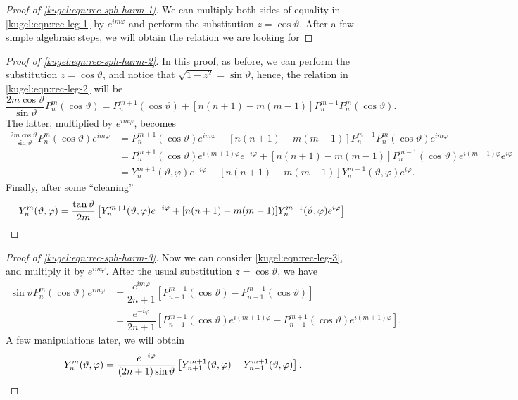 \begin{proof}[Proof of \eqref{kugel:eqn:rec-sph-harm-1}]
  We can multiply both sides of equality in \eqref{kugel:eqn:rec-leg-1} by $e^{im
  \varphi}$ and perform the substitution $z=\cos \vartheta$. After a few simple
  algebraic steps, we will obtain the relation we are looking for
\end{proof}

\begin{proof}[Proof of \eqref{kugel:eqn:rec-sph-harm-2}]
  In this proof, as before, we can perform the substitution $z=\cos \vartheta$,
  and notice that $\sqrt{1-z^2}=\sin \vartheta$, hence, the relation in
  \eqref{kugel:eqn:rec-leg-2} will be
  \begin{equation*}
    \frac{2m \cos \vartheta}{\sin \vartheta} P^m_n(\cos \vartheta) 
    = P^{m+1}_n(\cos \vartheta) + [n(n+1)-m(m-1)]P^{m-1}_n P^m_n(\cos \vartheta).
  \end{equation*}
  The latter, multiplied by $e^{im\varphi}$, becomes
  \begin{align*}
    \frac{2m \cos \vartheta}{\sin \vartheta} P^m_n(\cos \vartheta)e^{im\varphi}
      &= P^{m+1}_n(\cos \vartheta)e^{im\varphi}
       + [n(n+1)-m(m-1)]P^{m-1}_n P^m_n(\cos \vartheta)e^{im\varphi} \\
      &= P^{m+1}_n(\cos \vartheta)e^{i(m+1)\varphi}e^{-i\varphi}
       + [n(n+1)-m(m-1)]P^{m-1}_n (\cos \vartheta)e^{i(m-1)\varphi}e^{i\varphi} \\
      &= Y^{m+1}_n(\vartheta, \varphi)e^{-i\varphi}
       + [n(n+1)-m(m-1)]Y^{m-1}_n(\vartheta, \varphi)e^{i\varphi}.
  \end{align*}
  Finally, after some ``cleaning''
  \begin{equation*}
    Y^m_n(\vartheta, \varphi) = \frac{\tan \vartheta}{2m} \left[
      Y^{m+1}_n(\vartheta, \varphi)e^{-i\varphi}
      + [n(n+1)-m(m-1)]Y^{m-1}_n(\vartheta, \varphi)e^{i\varphi}
    \right]
    \qedhere
  \end{equation*}
\end{proof}

\begin{proof}[Proof of \eqref{kugel:eqn:rec-sph-harm-3}]
  Now we can consider \eqref{kugel:eqn:rec-leg-3}, and multiply it by
  $e^{im\varphi}$. After the usual substitution $z=\cos \vartheta$, we have 
  \begin{align*}
    \sin \vartheta P^m_n(\cos \vartheta)e^{im\varphi}
      &= \dfrac{e^{im\varphi}}{2n+1}\left[
          P^{m+1}_{n+1}(\cos \vartheta)
          - P^{m+1}_{n-1}(\cos \vartheta)
        \right] \\
      &= \dfrac{e^{-i\varphi}}{2n+1}\left[
          P^{m+1}_{n+1}(\cos \vartheta)e^{i(m+1)\varphi}
          - P^{m+1}_{n-1}(\cos \vartheta)e^{i(m+1)\varphi}
        \right].
  \end{align*}
  A few manipulations later, we will obtain
  \begin{equation*}
    Y^m_n(\vartheta, \varphi) = \frac{e^{-i\varphi}}{(2n+1)\sin \vartheta}
      \left[
        Y^{m+1}_{n+1}(\vartheta, \varphi)-Y^{m+1}_{n-1}(\vartheta, \varphi)
      \right].
    \qedhere
  \end{equation*}
\end{proof}

